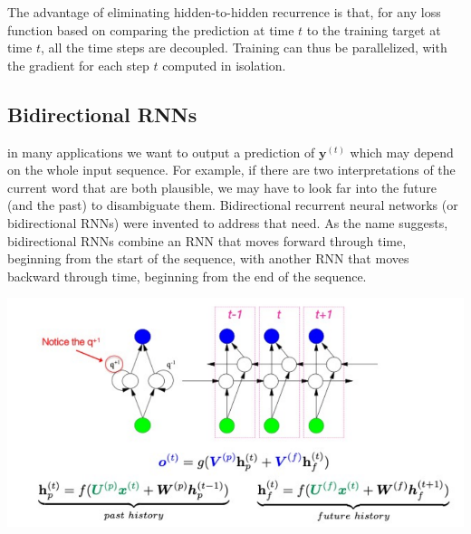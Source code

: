 The advantage of eliminating hidden-to-hidden recurrence is that, for any loss function based on comparing the prediction at time $t$ to the training target at time $t$, all the time steps are decoupled. Training can thus be parallelized, with the gradient for each step $t$ computed in isolation.

\subsection{Bidirectional RNNs}
in many applications we want to output a prediction of $\textbf{y}^{(t)}$ which may depend on the whole input sequence. For example, if there
are two interpretations of the current word that are both plausible, we may have to look far into the future (and the past) to disambiguate them. Bidirectional recurrent neural networks (or bidirectional RNNs) were invented to address that need.\newline\newline
As the name suggests, bidirectional RNNs combine an RNN that moves forward
through time, beginning from the start of the sequence, with another RNN that moves backward through time, beginning from the end of the sequence.
\begin{center}
    \includegraphics[scale=0.9]{images/bidirectional-rnn.png}
\end{center}

